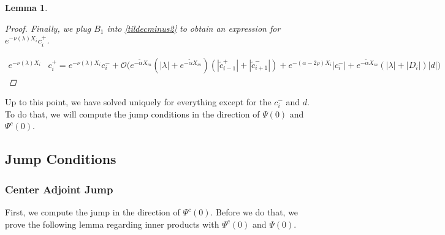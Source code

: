 \documentclass[12pt]{article}
\newtheorem{lemma}{Lemma}
\begin{document}
\begin{lemma}
\begin{proof}
Finally, we plug $B_1$ into \eqref{tildecminus2} to obtain an expression for $e^{-\nu(\lambda)X_i} c_i^+$.

\begin{align*}
e^{-\nu(\lambda)X_i} &c_i^+ = e^{-\nu(\lambda)X_i} c_i^- 
+ \mathcal{O}\Big( e^{-\tilde{\alpha}X_m} (|\lambda| + e^{-\tilde{\alpha}X_m})( |\tilde{c}_{i-1}^+| + |\tilde{c}_{i+1}^-|) 
+ e^{-(\alpha - 2 \rho) X_i}|c_i^-| +  e^{-\tilde{\alpha}X_m}(|\lambda| + |D_i|)|d| \Big)
\end{align*}

\end{proof}
\end{lemma}

Up to this point, we have solved uniquely for everything except for the $c_i^-$ and $d$. To do that, we will compute the jump conditions in the direction of $\Psi(0)$ and $\Psi^c(0)$.

\subsection{Jump Conditions}

\subsubsection{Center Adjoint Jump}

First, we compute the jump in the direction of $\Psi^c(0)$. Before we do that, we prove the following lemma regarding inner products with $\Psi^c(0)$ and $\Psi(0)$.

\end{document}
